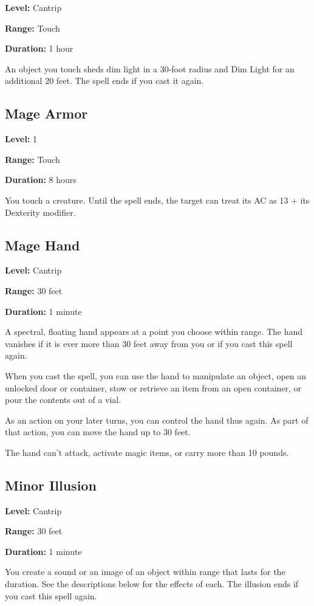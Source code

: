 \documentclass[12pt,letterpaper,twocolumn,openany,nodeprecatedcode,bg=none]{dndbook}
\let\oldsubsection\subsection
\renewcommand{\subsection}[1]{%
  \needspace{5\baselineskip}%
  \oldsubsection{#1}%
}
\begin{document}
\textbf{Level:} Cantrip

\textbf{Range:} Touch

\textbf{Duration:} 1 hour

An object you touch sheds dim light in a 30-foot radius and Dim Light
for an additional 20 feet. The spell ends if you cast it again.

\subsection{Mage Armor}\label{mage-armor}

\textbf{Level:} 1

\textbf{Range:} Touch

\textbf{Duration:} 8 hours

You touch a creature. Until the spell ends, the target can treat its AC
as 13 + its Dexterity modifier.

\subsection{Mage Hand}\label{mage-hand}

\textbf{Level:} Cantrip

\textbf{Range:} 30 feet

\textbf{Duration:} 1 minute

A spectral, floating hand appears at a point you choose within range.
The hand vanishes if it is ever more than 30 feet away from you or if
you cast this spell again.

When you cast the spell, you can use the hand to manipulate an object,
open an unlocked door or container, stow or retrieve an item from an
open container, or pour the contents out of a vial.

As an action on your later turns, you can control the hand thus again.
As part of that action, you can move the hand up to 30 feet.

The hand can't attack, activate magic items, or carry more than 10
pounds.

\subsection{Minor Illusion}\label{minor-illusion}

\textbf{Level:} Cantrip

\textbf{Range:} 30 feet

\textbf{Duration:} 1 minute

You create a sound or an image of an object within range that lasts for
the duration. See the descriptions below for the effects of each. The
illusion ends if you cast this spell again.
\end{document}
